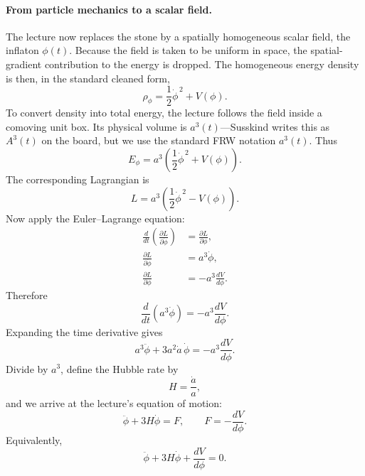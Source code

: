 \paragraph{From particle mechanics to a scalar field.}
The lecture now replaces the stone by a spatially homogeneous scalar field, the inflaton \(\phi(t)\). Because the field is taken to be uniform in space, the spatial-gradient contribution to the energy is dropped. The homogeneous energy density is then, in the standard cleaned form,
\begin{equation}
\rho_\phi=\frac{1}{2}\dot{\phi}^{\,2}+V(\phi).
\end{equation}
To convert density into total energy, the lecture follows the field inside a comoving unit box. Its physical volume is \(a^3(t)\)---Susskind writes this as \(A^3(t)\) on the board, but we use the standard FRW notation \(a^3(t)\). Thus
\begin{equation}
E_\phi=a^3\!\left(\frac{1}{2}\dot{\phi}^{\,2}+V(\phi)\right).
\end{equation}
The corresponding Lagrangian is
\begin{equation}
L=a^3\!\left(\frac{1}{2}\dot{\phi}^{\,2}-V(\phi)\right).
\end{equation}
Now apply the Euler--Lagrange equation:
\begin{align}
\frac{d}{dt}\left(\frac{\partial L}{\partial \dot{\phi}}\right)&=\frac{\partial L}{\partial \phi},\\
\frac{\partial L}{\partial \dot{\phi}}&=a^3\dot{\phi},\\
\frac{\partial L}{\partial \phi}&=-a^3\frac{dV}{d\phi}.
\end{align}
Therefore
\begin{equation}
\frac{d}{dt}\left(a^3\dot{\phi}\right)=-a^3\frac{dV}{d\phi}.
\end{equation}
Expanding the time derivative gives
\begin{equation}
a^3\ddot{\phi}+3a^2\dot a\,\dot{\phi}=-a^3\frac{dV}{d\phi}.
\end{equation}
Divide by \(a^3\), define the Hubble rate by
\begin{equation}
H=\frac{\dot a}{a},
\end{equation}
and we arrive at the lecture's equation of motion:
\begin{equation}
\ddot{\phi}+3H\dot{\phi}=F,
\qquad
F=-\frac{dV}{d\phi}.
\end{equation}
Equivalently,
\begin{equation}
\ddot{\phi}+3H\dot{\phi}+\frac{dV}{d\phi}=0.
\end{equation}

